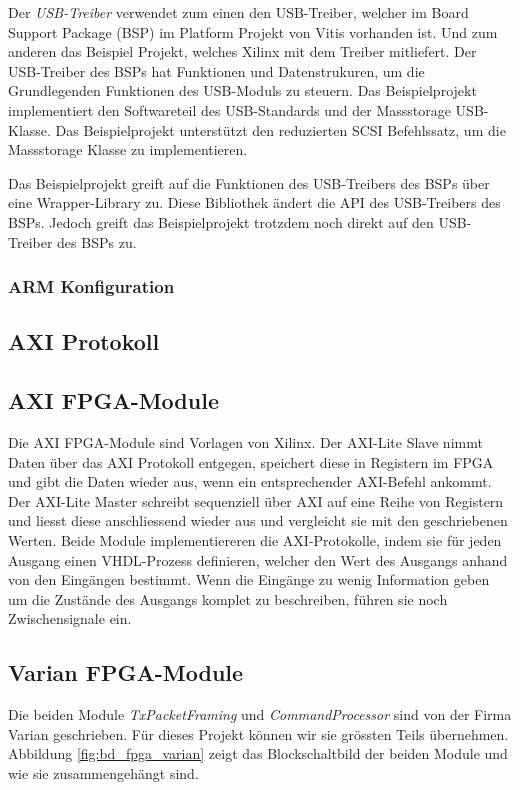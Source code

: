 \documentclass{article}
\begin{document}
Der \textit{USB-Treiber} verwendet zum einen den USB-Treiber, welcher im Board Support Package (BSP) im Platform Projekt von Vitis vorhanden ist. Und zum anderen das Beispiel Projekt, welches Xilinx mit dem Treiber mitliefert. Der USB-Treiber des BSPs hat Funktionen und Datenstrukuren, um die Grundlegenden Funktionen des USB-Moduls zu steuern. Das Beispielprojekt implementiert den Softwareteil des USB-Standards und der Massstorage USB-Klasse. Das Beispielprojekt unterstützt den reduzierten SCSI Befehlssatz, um die Massstorage Klasse zu implementieren.

Das Beispielprojekt greift auf die Funktionen des USB-Treibers des BSPs über eine Wrapper-Library zu. Diese Bibliothek ändert die API des USB-Treibers des BSPs. Jedoch greift das Beispielprojekt trotzdem noch direkt auf den USB-Treiber des BSPs zu. 
\subsubsection*{ARM Konfiguration}

\subsection{AXI Protokoll}

\subsection{AXI FPGA-Module}
\label{sec:axi}
Die AXI FPGA-Module sind Vorlagen von Xilinx. Der AXI-Lite Slave nimmt Daten über das AXI Protokoll entgegen, speichert diese in Registern im FPGA und gibt die Daten wieder aus, wenn ein entsprechender AXI-Befehl ankommt. Der AXI-Lite Master schreibt sequenziell über AXI auf eine Reihe von Registern und liesst diese anschliessend wieder aus und vergleicht sie mit den geschriebenen Werten. Beide Module implementiereren die AXI-Protokolle, indem sie für jeden Ausgang einen VHDL-Prozess definieren, welcher den Wert des Ausgangs anhand von den Eingängen bestimmt. Wenn die Eingänge zu wenig Information geben um die Zustände des Ausgangs komplet zu beschreiben, führen sie noch Zwischensignale ein.


\subsection{Varian FPGA-Module}
Die beiden Module \textit{TxPacketFraming} und \textit{CommandProcessor} sind von der Firma Varian geschrieben. Für dieses Projekt können wir sie grössten Teils übernehmen. Abbildung \ref{fig:bd_fpga_varian} zeigt das Blockschaltbild der beiden Module und wie sie zusammengehängt sind.
\end{document}
